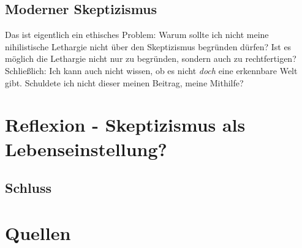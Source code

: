 \documentclass[12pt,a4paper]{article}
\begin{document}
	\subsection{Moderner Skeptizismus}
Das ist eigentlich ein ethisches Problem: Warum sollte ich nicht meine nihilistische Lethargie nicht über den Skeptizismus begründen dürfen? Ist es möglich die Lethargie nicht nur zu begründen, sondern auch zu rechtfertigen? Schließlich: Ich kann auch nicht wissen, ob es nicht \emph{doch} eine erkennbare Welt gibt. Schuldete ich nicht dieser meinen Beitrag, meine Mithilfe?\\ %

		
		
		
		
\section{Reflexion - Skeptizismus als Lebenseinstellung?}
	\subsection{Schluss}


\section*{Quellen}
\end{document}
